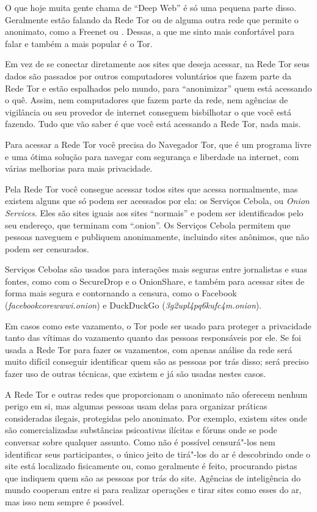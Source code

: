 O que hoje muita gente chama de ``Deep Web'' é só uma pequena parte disso.
Geralmente estão falando da Rede Tor ou de alguma outra rede que permite
o anonimato, como a Freenet ou . Dessas, a que me sinto mais
confortável para falar e também a mais popular é o Tor.

Em vez de se conectar diretamente aos sites que deseja acessar, na
Rede Tor seus dados são passados por outros computadores voluntários que
fazem parte da Rede Tor e estão espalhados pelo mundo, para ``anonimizar''
quem está acessando o quê. Assim, nem computadores que fazem parte da
rede, nem agências de vigilância ou seu provedor de internet conseguem
bisbilhotar o que você está fazendo. Tudo que vão saber é que você está
acessando a Rede Tor, nada mais.

Para acessar a Rede Tor você precisa do
Navegador Tor, que é um programa
livre e uma ótima solução para navegar com segurança e liberdade na
internet, com várias melhorias para mais privacidade.

Pela Rede Tor você consegue acessar todos sites que acessa normalmente,
mas existem alguns que só podem ser acessados por ela: os Serviços
Cebola, ou \emph{Onion Services}. Eles são sites iguais aos sites ``normais'' e
podem ser identificados pelo seu endereço, que terminam com ``.onion''. Os
Serviços Cebola permitem que pessoas naveguem e publiquem anonimamente,
incluindo sites anônimos, que não podem ser censurados.

Serviços Cebolas são usados para interações mais seguras entre
jornalistas e suas fontes, como com o
SecureDrop e o
OnionShare, e também para acessar
sites de forma mais segura e contornando a censura, como o
Facebook (\emph{facebookcorewwwi.onion}) e DuckDuckGo
(\emph{3g2upl4pq6kufc4m.onion}).

Em casos como este vazamento, o Tor pode ser usado para proteger a
privacidade tanto das vítimas do vazamento quanto das pessoas
responsáveis por ele. Se foi usada a Rede Tor para fazer os vazamentos,
com apenas análise da rede será muito difícil conseguir identificar quem
são as pessoas por trás disso; será preciso fazer uso de outras
técnicas, que existem e já são usadas nestes casos.

A Rede Tor e outras redes que proporcionam o anonimato não oferecem
nenhum perigo em si, mas algumas pessoas usam delas para organizar
práticas consideradas ilegais, protegidas pelo anonimato. Por exemplo,
existem sites onde são comercializadas substâncias psicoativas ilícitas
e fóruns onde se pode conversar sobre qualquer assunto. Como não é possível
censurá"-los nem identificar seus participantes, o único jeito de
tirá"-los do ar é descobrindo onde o site está localizado fisicamente ou,
como geralmente é feito, procurando pistas que indiquem quem são as
pessoas por trás do site. Agências de inteligência do mundo cooperam
entre si para realizar operações e tirar sites como esses do ar, mas
isso nem sempre é possível.

